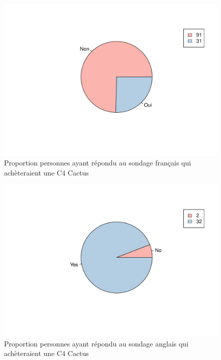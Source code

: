 \documentclass[12pt]{article}\usepackage[]{graphicx}\usepackage[]{color}
\makeatletter
\def\maxwidth{ %
  \ifdim\Gin@nat@width>\linewidth
    \linewidth
  \else
    \Gin@nat@width
  \fi
}
\newenvironment{knitrout}{}{} %
\makeatother
\begin{document}
\begin{knitrout}
\color{fgcolor}\begin{figure}[H]
\includegraphics[width=\maxwidth]{figure/buy_fr-1} \caption[Proportion personnes ayant répondu au sondage français qui achèteraient une C4 Cactus]{Proportion personnes ayant répondu au sondage français qui achèteraient une C4 Cactus}\label{fig:buy fr}
\end{figure}


\end{knitrout}

\begin{knitrout}
\color{fgcolor}\begin{figure}[H]
\includegraphics[width=\maxwidth]{figure/buy_en-1} \caption[Proportion personnes ayant répondu au sondage anglais qui achèteraient une C4 Cactus]{Proportion personnes ayant répondu au sondage anglais qui achèteraient une C4 Cactus}\label{fig:buy en}
\end{figure}


\end{knitrout}
\end{document}
